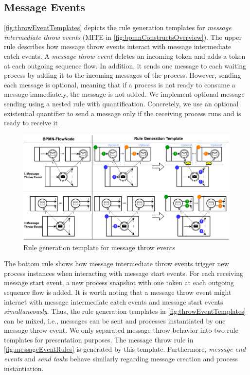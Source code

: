 \documentclass[submission, copyright, creativecommons]{eptcs}
\begin{document}
\subsection{Message Events}
\autoref{fig:throwEventTemplates} depicts the rule generation templates for \textit{message intermediate throw events} (\textsf{MITE} in \autoref{fig:bpmnConstructsOverview}).
The upper rule describes how message throw events interact with message intermediate catch events.
A \textit{message throw event} deletes an incoming token and adds a token at each outgoing sequence flow.
In addition, it sends one message to each waiting process by adding it to the incoming messages of the process.
However, sending each message is optional, meaning that if a process is not ready to consume a message immediately, the message is not added.
We implement optional message sending using a nested rule with quantification.
Concretely, we use an optional existential quantifier to send a message only if the receiving process runs and is ready to receive it \cite{rensinkNestedQuantificationGraph2006}.

\begin{figure}[h]
    \centering
    \includegraphics[width=1\textwidth]{images/throw_messages.pdf}
    \caption{Rule generation template for message throw events}
    \label{fig:throwEventTemplates}
\end{figure}

The bottom rule shows how message intermediate throw events trigger new process instances when interacting with message start events.
For each receiving message start event, a new process snapshot with one token at each outgoing sequence flow is added.
It is worth noting that a message throw event might interact with message intermediate catch events and message start events \textit{simultaneously}.
Thus, the rule generation templates in \autoref{fig:throwEventTemplates} can be mixed, i.e., messages can be sent and processes instantiated by one message throw event.
We only separated message throw behavior into two rule templates for presentation purposes.
The message throw rule in \autoref{fig:messageEventRules} is generated by this template.
Furthermore, \textit{message end events} and \textit{send task}s behave similarly regarding message creation and process instantiation.
\end{document}
